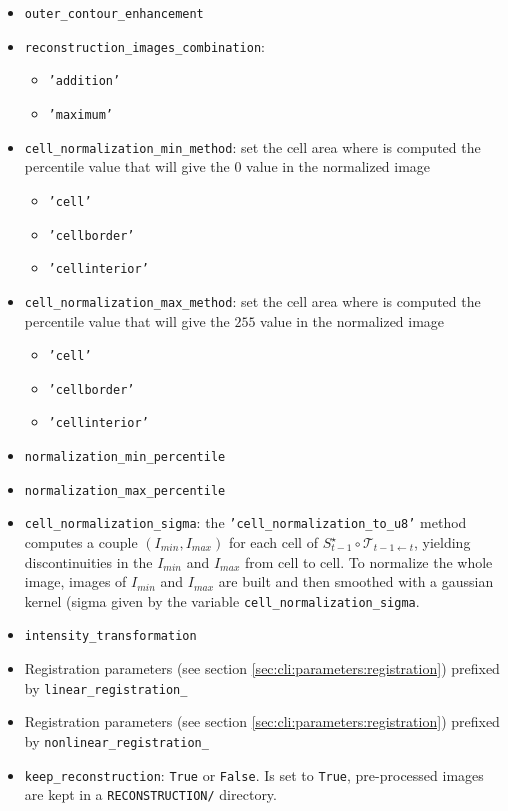 \begin{itemize}
\item \texttt{outer\_contour\_enhancement}

\item \texttt{reconstruction\_images\_combination}:
  \begin{itemize}
  \item \texttt{'addition'}
  \item \texttt{'maximum'}
  \end{itemize}
\item \texttt{cell\_normalization\_min\_method}:
  set the cell area where is computed the percentile value that 
  will give the $0$ value in the normalized image
  \begin{itemize}
  \item \texttt{'cell'}
  \item \texttt{'cellborder'}
  \item \texttt{'cellinterior'}
  \end{itemize}
\item \texttt{cell\_normalization\_max\_method}:
  set the cell area where is computed the percentile value that 
  will give the $255$ value in the normalized image
  \begin{itemize}
  \item \texttt{'cell'}
  \item \texttt{'cellborder'}
  \item \texttt{'cellinterior'}
  \end{itemize}
\item \texttt{normalization\_min\_percentile}
\item \texttt{normalization\_max\_percentile}
\item \texttt{cell\_normalization\_sigma}:
the \texttt{'cell\_normalization\_to\_u8'} method computes a couple $(I_{min}, I_{max})$ for each cell of $S^{\star}_{t-1} \circ \mathcal{T}_{t-1 \leftarrow t}$, yielding discontinuities in the $I_{min}$ and $I_{max}$ from cell to cell. To normalize the whole image, images of $I_{min}$ and $I_{max}$ are built and then smoothed with a gaussian kernel (sigma given by the variable \texttt{cell\_normalization\_sigma}.
\item \texttt{intensity\_transformation}
\item Registration parameters 
  (see section \ref{sec:cli:parameters:registration}) prefixed 
  by \texttt{linear\_registration\_}
\item Registration parameters 
  (see section \ref{sec:cli:parameters:registration}) prefixed 
  by \texttt{nonlinear\_registration\_}
\item \texttt{keep\_reconstruction}:
  \texttt{True} or \texttt{False}. Is set to \texttt{True}, 
  pre-processed images are kept in a \texttt{RECONSTRUCTION/} directory.
\end{itemize}










